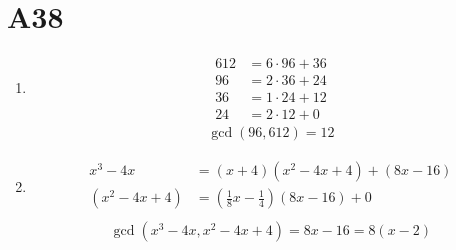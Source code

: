 \documentclass[fleqn,12pt]{scrartcl}
\begin{document}
\section*{A38}
\begin{enumerate}
	\item
		\begin{align*}
			612 &= 6 \cdot 96 + 36\\
			96 &= 2 \cdot 36 + 24 \\
			36 &= 1 \cdot 24 + 12\\
			24 &= 2 \cdot 12 + 0
		\end{align*}
		\begin{align*}
			\gcd(96, 612) = 12
		\end{align*}
		
	\item
		\begin{align*}
			x^3 -4x &= \left(x+4\right)\left(x^2 -4x+4\right) + \left(8x -16\right)\\
			\left(x^2 - 4x + 4\right) &= \left(\frac18 x - \frac14\right) \left(8x - 16\right) + 0 \\
		\end{align*}
		\begin{align*}
			\gcd(x^3 -4x, x^2 -4x + 4) = 8x - 16 = 8(x - 2)
		\end{align*}
\end{enumerate}
\end{document}
